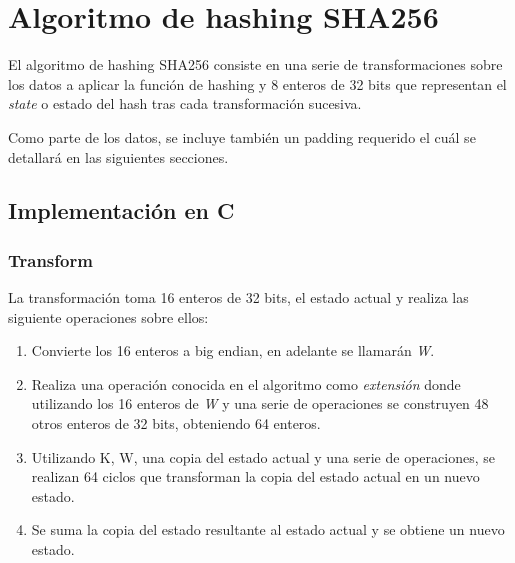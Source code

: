 \documentclass[a4paper, 10pt, twoside]{article}
\begin{document}

\section{Algoritmo de hashing SHA256}

El algoritmo de hashing SHA256 consiste en una serie de transformaciones sobre los datos a aplicar la función de hashing y 
8 enteros de 32 bits que representan el \textit{state} o estado del hash tras cada transformación sucesiva.

Como parte de los datos, se incluye también un padding requerido el cuál se detallará en las siguientes secciones.

\subsection{Implementación en C}

\subsubsection{Transform} \label{transform_c}
La transformación toma 16 enteros de 32 bits, el estado actual y realiza las siguiente operaciones sobre ellos:

\begin{enumerate}
\item Convierte los 16 enteros a big endian, en adelante se llamarán \textit{W}.
\item Realiza una operación conocida en el algoritmo como \textit{extensión} donde utilizando los 16 enteros de \textit{W}
y una serie de operaciones se construyen 48 otros enteros de 32 bits, obteniendo 64 enteros.
\item Utilizando K, W, una copia del estado actual y una serie de operaciones, se realizan 64 ciclos que transforman 
la copia del estado actual en un nuevo estado.
\item Se suma la copia del estado resultante al estado actual y se obtiene un nuevo estado.
\end{enumerate}
\end{document}
